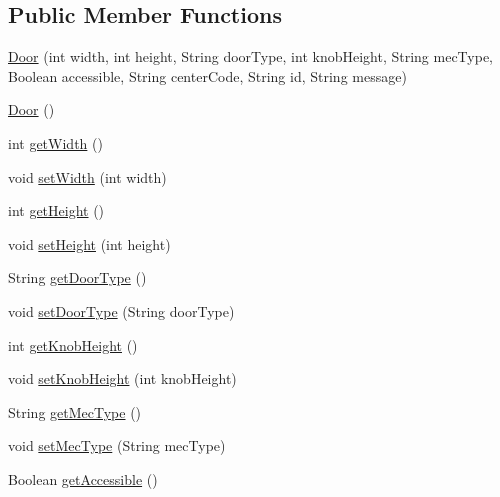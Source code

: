 \subsection*{Public Member Functions}
\begin{DoxyCompactItemize}
\item 
\mbox{\hyperlink{classcom_1_1osoc_1_1oncera_1_1javabean_1_1_door_a67f19cb0ecd6d2d3af0cff87167435e5}{Door}} (int width, int height, String door\+Type, int knob\+Height, String mec\+Type, Boolean accessible, String center\+Code, String id, String message)
\item 
\mbox{\hyperlink{classcom_1_1osoc_1_1oncera_1_1javabean_1_1_door_a7db7477f58795edcf2101a73cb7beaba}{Door}} ()
\item 
int \mbox{\hyperlink{classcom_1_1osoc_1_1oncera_1_1javabean_1_1_door_ad58f5e1cf1f246663afac156eb7af396}{get\+Width}} ()
\item 
void \mbox{\hyperlink{classcom_1_1osoc_1_1oncera_1_1javabean_1_1_door_a6beddbb6f01ced78ac33287a19897451}{set\+Width}} (int width)
\item 
int \mbox{\hyperlink{classcom_1_1osoc_1_1oncera_1_1javabean_1_1_door_a810c58affa65e4fa535ca5ea0b8f5794}{get\+Height}} ()
\item 
void \mbox{\hyperlink{classcom_1_1osoc_1_1oncera_1_1javabean_1_1_door_a6ff9c85b9769925f0b21b06d948852cd}{set\+Height}} (int height)
\item 
String \mbox{\hyperlink{classcom_1_1osoc_1_1oncera_1_1javabean_1_1_door_a758bf20897434e6b2ee5fa963f44296c}{get\+Door\+Type}} ()
\item 
void \mbox{\hyperlink{classcom_1_1osoc_1_1oncera_1_1javabean_1_1_door_a019a153c356cd944ba2784dd93af6cc1}{set\+Door\+Type}} (String door\+Type)
\item 
int \mbox{\hyperlink{classcom_1_1osoc_1_1oncera_1_1javabean_1_1_door_a2d2630499c8e2fac51de19619967c7d0}{get\+Knob\+Height}} ()
\item 
void \mbox{\hyperlink{classcom_1_1osoc_1_1oncera_1_1javabean_1_1_door_af238c2972a4565af9ef52f5e79e3a685}{set\+Knob\+Height}} (int knob\+Height)
\item 
String \mbox{\hyperlink{classcom_1_1osoc_1_1oncera_1_1javabean_1_1_door_a098d170a3c62a2e9feb3a02fdcb776a0}{get\+Mec\+Type}} ()
\item 
void \mbox{\hyperlink{classcom_1_1osoc_1_1oncera_1_1javabean_1_1_door_aea84e2341ca107746dc0323a941081cf}{set\+Mec\+Type}} (String mec\+Type)
\item 
Boolean \mbox{\hyperlink{classcom_1_1osoc_1_1oncera_1_1javabean_1_1_door_a25770dd21668e36e50f383d098852a1f}{get\+Accessible}} ()

\end{DoxyCompactItemize}
